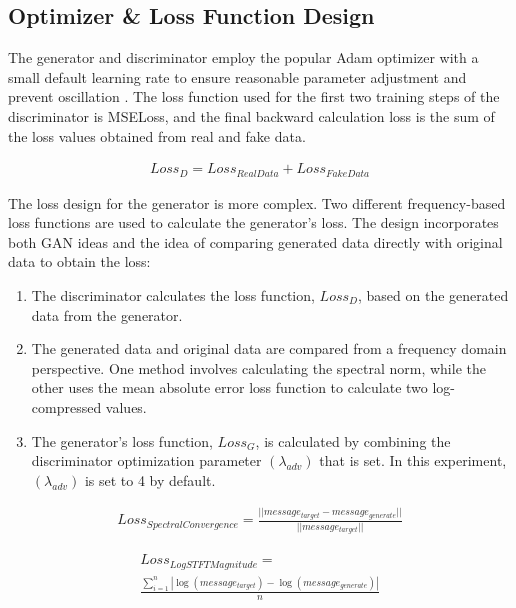 \documentclass[10pt,journal,compsoc]{IEEEtran}
\begin{document}
\subsection{Optimizer \& Loss Function Design}

The generator and discriminator employ the popular Adam optimizer with a small default learning rate to ensure reasonable parameter adjustment and prevent oscillation \cite{19}. The loss function used for the first two training steps of the discriminator is MSELoss, and the final backward calculation loss is the sum of the loss values obtained from real and fake data.

\begin{align}
    Loss_D = Loss_{RealData} + Loss_{FakeData}
\end{align}

The loss design for the generator is more complex. Two different frequency-based loss functions are used to calculate the generator's loss. The design incorporates both GAN ideas and the idea of comparing generated data directly with original data to obtain the loss:

\begin{enumerate}
    \item The discriminator calculates the loss function, $Loss_D$, based on the generated data from the generator.

    \item The generated data and original data are compared from a frequency domain perspective. One method involves calculating the spectral norm, while the other uses the mean absolute error loss function to calculate two log-compressed values.

    \item The generator's loss function, $Loss_G$, is calculated by combining the discriminator optimization parameter $(\lambda_{adv})$ that is set. In this experiment, $(\lambda_{adv})$ is set to 4 by default.
\end{enumerate}

\begin{align}
    Loss_{SpectralConvergence} = \frac{||message_{target} - message_{generate}||}
                                      {||message_{target}||}
\end{align}

\begin{equation}
    \begin{aligned}
        Loss_{LogSTFTMagnitude} = \\ \frac{\sum_{i=1}^{n} {|\log{(message_{target})} - \log{(message_{generate})}|}} {n}
    \end{aligned}
\end{equation}
\end{document}
